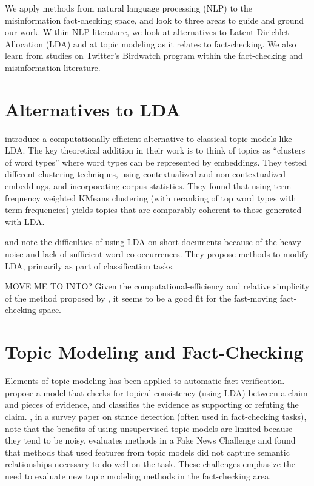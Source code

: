 \documentclass [11pt, proquest] {uwthesis}[2020/02/24]
\begin{document}
We apply methods from natural language processing (NLP) to the misinformation fact-checking space, and look to three areas to guide and ground our work.  Within NLP literature, we look at alternatives to  Latent Dirichlet Allocation (LDA) \cite{blei2003latent} and at topic modeling as it relates to fact-checking. We also learn from studies on Twitter's Birdwatch program within the fact-checking and misinformation literature.

\section{Alternatives to LDA}

 \cite{sia-etal-2020-tired} introduce a computationally-efficient alternative to classical topic models like LDA. The key theoretical addition in their work is to think of  topics as “clusters of word types” where word types can be represented by embeddings.  They tested different clustering techniques, using contextualized and non-contextualized embeddings, and incorporating  corpus statistics. They found that using term-frequency weighted KMeans clustering (with reranking of top word types with term-frequencies) yields topics that are comparably coherent to those generated with LDA.

 \cite{chen2016short} and \cite{pang2016mr} note the difficulties of using LDA on short documents because of the heavy noise and lack of sufficient word co-occurrences. They propose methods to modify LDA, primarily as part of classification tasks.

MOVE ME TO INTO?
 Given the computational-efficiency and relative simplicity of the method proposed by \cite{sia-etal-2020-tired}, it seems to be a good fit for the fast-moving fact-checking space.

 \section{Topic Modeling and Fact-Checking}
 Elements of topic modeling has been applied to automatic fact verification. \cite{si-etal-2021-topic} propose a model that checks for topical consistency (using LDA) between a claim and pieces of evidence, and classifies the evidence as supporting or refuting the claim. \cite{Hardalov2021ASO}, in a survey paper on stance detection (often used in fact-checking tasks),  note that the benefits of using unsupervised topic models are limited because they tend to be noisy. \cite{hanselowski-etal-2018-retrospective} evaluates methods in a Fake News Challenge and found that methods that used features from topic models did not capture semantic relationships necessary to do well on the task. These challenges emphasize the need to evaluate new topic modeling methods in the fact-checking area.
\end{document}
